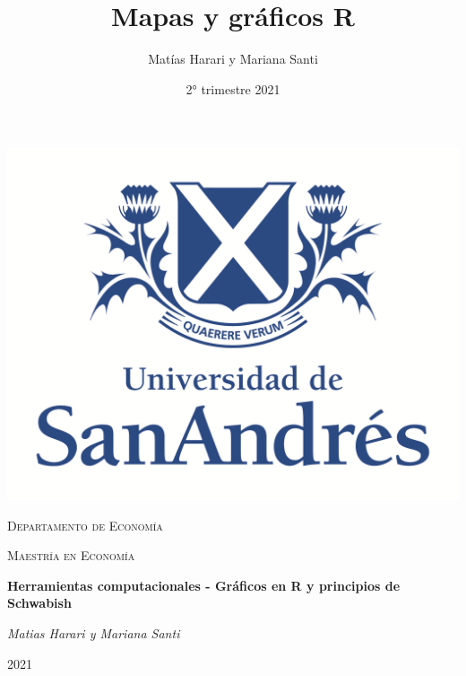 \documentclass[10.5pt]{article}   %
\title{Mapas y gráficos R}
\author{Matías Harari y Mariana Santi}
\date{2° trimestre 2021}
\begin{document}
\renewcommand{\thesubsection}{\thesection.\alph{subsection}}

\thispagestyle{empty}
\setlength\headheight{0pt} 
\begin{center}

\begin{center}
\includegraphics[width=0.65\linewidth]{imgs/logoudesa.png}            
\end{center}	

        \vspace{0.2cm}
        {\scshape\LARGE Departamento de Economía \par}
        \vspace{0.2cm}
        {\scshape\Large Maestría en Economía\par}
        \vspace{0.4cm}

        {\Large\bfseries Herramientas computacionales - Gráficos en R y principios de Schwabish\par}
        
        \vspace{1cm}
        {\Large\itshape Matias Harari y Mariana Santi \par}


\vspace{1cm} 
\large
{2021}

\end{center}

\clearpage
\justify
\end{document}
